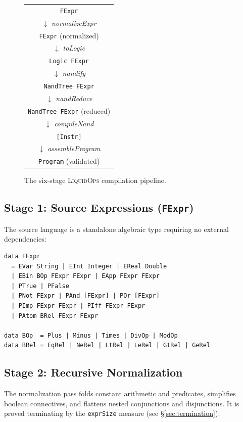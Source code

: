 \documentclass[sigconf,natbib=false]{acmart}
\begin{document}
\begin{figure}[h]
\centering
\begin{tabular}{c}
\texttt{FExpr} \\
$\downarrow$ \textit{normalizeExpr} \\
\texttt{FExpr} (normalized) \\
$\downarrow$ \textit{toLogic} \\
\texttt{Logic FExpr} \\
$\downarrow$ \textit{nandify} \\
\texttt{NandTree FExpr} \\
$\downarrow$ \textit{nandReduce} \\
\texttt{NandTree FExpr} (reduced) \\
$\downarrow$ \textit{compileNand} \\
\texttt{[Instr]} \\
$\downarrow$ \textit{assembleProgram} \\
\texttt{Program} (validated) \\
\end{tabular}
\caption{The six-stage \textsc{LiquidOps} compilation pipeline.}
\label{fig:pipeline}
\end{figure}

\subsection{Stage 1: Source Expressions (\texttt{FExpr})}

The source language is a standalone algebraic type requiring no external
dependencies:

\begin{lstlisting}[style=haskell,caption={FExpr source type}]
data FExpr
  = EVar String | EInt Integer | EReal Double
  | EBin BOp FExpr FExpr | EApp FExpr FExpr
  | PTrue | PFalse
  | PNot FExpr | PAnd [FExpr] | POr [FExpr]
  | PImp FExpr FExpr | PIff FExpr FExpr
  | PAtom BRel FExpr FExpr

data BOp  = Plus | Minus | Times | DivOp | ModOp
data BRel = EqRel | NeRel | LtRel | LeRel | GtRel | GeRel
\end{lstlisting}

\subsection{Stage 2: Recursive Normalization}

The normalization pass folds constant arithmetic and predicates, simplifies
boolean connectives, and flattens nested conjunctions and disjunctions. It is
proved terminating by the \texttt{exprSize} measure (see \S\ref{sec:termination}).
\end{document}
